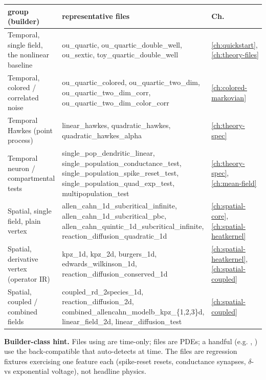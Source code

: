\begin{center}
\begin{longtable}{@{}>{\raggedright}p{} >{\ttfamily\footnotesize\raggedright}p{} >{\centering}p{}@{}}
\toprule
\textbf{group (builder)} & \normalfont\textbf{representative files} & \textbf{Ch.} \tabularnewline
\midrule
\endhead
\bottomrule
\endfoot
Temporal, single field, the nonlinear baseline
  & ou\_quartic, ou\_quartic\_double\_well, ou\_sextic,
    toy\_quartic\_double\_well
  & \ref{ch:quickstart},\,\ref{ch:theory-files} \tabularnewline
\addlinespace
Temporal, colored / correlated noise
  & ou\_quartic\_colored, ou\_quartic\_two\_dim,
    ou\_quartic\_two\_dim\_corr, ou\_quartic\_two\_dim\_color\_corr
  & \ref{ch:colored-markovian} \tabularnewline
\addlinespace
Temporal Hawkes (point process)
  & linear\_hawkes, quadratic\_hawkes, quadratic\_hawkes\_alpha
  & \ref{ch:theory-spec} \tabularnewline
\addlinespace
Temporal neuron / compartmental tests
  & single\_pop\_dendritic\_linear,
    single\_population\_conductance\_test,
    single\_population\_spike\_reset\_test,
    single\_population\_quad\_exp\_test, multipopulation\_test
  & \ref{ch:theory-spec},\,\ref{ch:mean-field} \tabularnewline
\addlinespace
Spatial, single field, plain vertex
  & allen\_cahn\_1d\_subcritical\_infinite,
    allen\_cahn\_1d\_subcritical\_pbc,
    allen\_cahn\_quintic\_1d\_subcritical\_infinite,
    reaction\_diffusion\_quadratic\_1d
  & \ref{ch:spatial-core},\,\ref{ch:spatial-heatkernel} \tabularnewline
\addlinespace
Spatial, derivative vertex (operator IR)
  & kpz\_1d, kpz\_2d, burgers\_1d, edwards\_wilkinson\_1d,
    reaction\_diffusion\_conserved\_1d
  & \ref{ch:spatial-heatkernel},\,\ref{ch:spatial-coupled} \tabularnewline
\addlinespace
Spatial, coupled / combined fields
  & coupled\_rd\_2species\_1d, reaction\_diffusion\_2d,
    combined\_allencahn\_modelb\_kpz\_\{1,2,3\}d, linear\_field\_2d,
    linear\_diffusion\_test
  & \ref{ch:spatial-coupled} \tabularnewline
\end{longtable}
\end{center}

\begin{note}
\textbf{Builder-class hint.} Files using  are
time-only;  files are PDEs; a handful (e.g.
,
) use the back-compatible
 that auto-detects at  time. The
 files are regression fixtures exercising one feature each
(spike-reset resets, conductance synapses, $\delta$- vs exponential
voltage), not headline physics.
\end{note}

